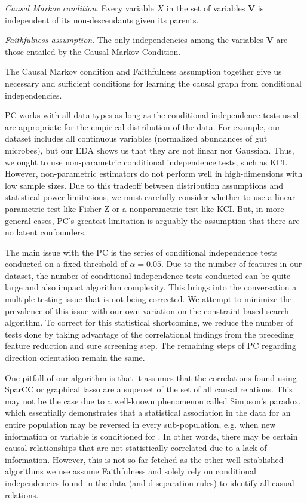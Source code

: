 \documentclass[12pt,letterpaper]{article}
\begin{document}
\textit{Causal Markov condition}. Every variable $X$ in the set of variables $\textbf{V}$ is independent of its non-descendants given its parents. 

\textit{Faithfulness assumption}. The only independencies among the variables $\textbf{V}$ are those entailed by the Causal Markov Condition.

The Causal Markov condition and Faithfulness assumption together give us necessary and sufficient conditions for learning the causal graph from conditional independencies. 

PC works with all data types as long as the conditional independence tests used are appropriate for the empirical distribution of the data. For example, our dataset includes all continuous variables (normalized abundances of gut microbes), but our EDA shows us that they are not linear nor Gaussian. Thus, we ought to use non-parametric conditional independence tests, such as KCI. However, non-parametric estimators do not perform well in high-dimensions with low sample sizes. Due to this tradeoff between distribution assumptions and statistical power limitations, we must carefully consider whether to use a linear parametric test like Fisher-Z or a nonparametric test like KCI. But, in more general cases, PC’s greatest limitation is arguably the assumption that there are no latent confounders.

The main issue with the PC is the series of conditional independence tests conducted on a fixed threshold of $\alpha = 0.05$. Due to the number of features in our dataset, the number of conditional independence tests conducted can be quite large and also impact algorithm complexity. This brings into the conversation a multiple-testing issue that is not being corrected. We attempt to minimize the prevalence of this issue with our own variation on the constraint-based search algorithm. To correct for this statistical shortcoming, we reduce the number of tests done by taking advantage of the correlational findings from the preceding feature reduction and sure screening step. The remaining steps of PC regarding direction orientation remain the same. 

One pitfall of our algorithm is that it assumes that the correlations found using SparCC or graphical lasso are a superset of the set of all causal relations. This may not be the case due to a well-known phenomenon called Simpson’s paradox, which essentially demonstrates that a statistical association in the data for an entire population may be reversed in every sub-population, e.g. when new information or variable is conditioned for \citep{pearl2016primer}. In other words, there may be certain causal relationships that are not statistically correlated due to a lack of information. However, this is not so far-fetched as the other well-established algorithms we use assume Faithfulness and solely rely on conditional independencies found in the data (and d-separation rules) to identify all casual relations. 
\end{document}
